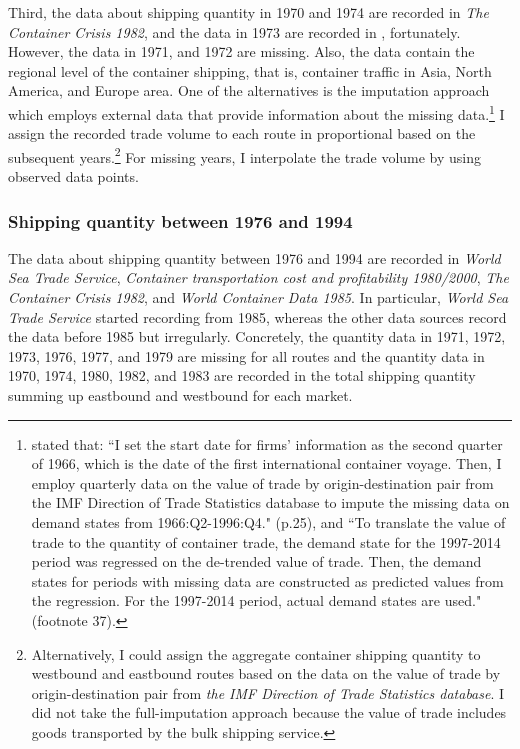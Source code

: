 Third, the data about shipping quantity in 1970 and 1974 are recorded in \textit{The Container Crisis 1982}, and the data in 1973 are recorded in , fortunately. However, the data in 1971, and 1972 are missing. Also, the data contain the regional level of the container shipping, that is, container traffic in Asia, North America, and Europe area. One of the alternatives is the imputation approach which employs external data that provide information about the missing data.\footnote{\cite{jeon2022learning} stated that: ``I set the start date for firms’ information as the second quarter of 1966, which is the date of the first international container voyage. Then, I employ quarterly data on the value of trade by origin-destination pair from the IMF Direction of Trade Statistics database to impute the missing data on demand states from 1966:Q2-1996:Q4." (p.25), and ``To translate the value of trade to the quantity of container trade, the demand state for the 1997-2014 period was regressed on the de-trended value of trade. Then, the demand states for periods with missing data are constructed as predicted values from the regression. For the 1997-2014 period, actual demand states are used." (footnote 37).} I assign the recorded trade volume to each route in proportional based on the subsequent years.\footnote{Alternatively, I could assign the aggregate container shipping quantity to westbound and eastbound routes based on the data on the value of trade by origin-destination pair from \textit{the IMF Direction of Trade Statistics database}. I did not take the full-imputation approach because the value of trade includes goods transported by the bulk shipping service.} For missing years, I interpolate the trade volume by using observed data points.



\subsubsection{Shipping quantity between 1976 and 1994}

The data about shipping quantity between 1976 and 1994 are recorded in \textit{World Sea Trade Service}, \textit{Container transportation cost and profitability 1980/2000}, \textit{The Container Crisis 1982}, and \textit{World Container Data 1985}. In particular, \textit{World Sea Trade Service} started recording from 1985, whereas the other data sources record the data before 1985 but irregularly. Concretely, the quantity data in 1971, 1972, 1973, 1976, 1977, and 1979 are missing for all routes and the quantity data in 1970, 1974, 1980, 1982, and 1983 are recorded in the total shipping quantity summing up eastbound and westbound for each market.




